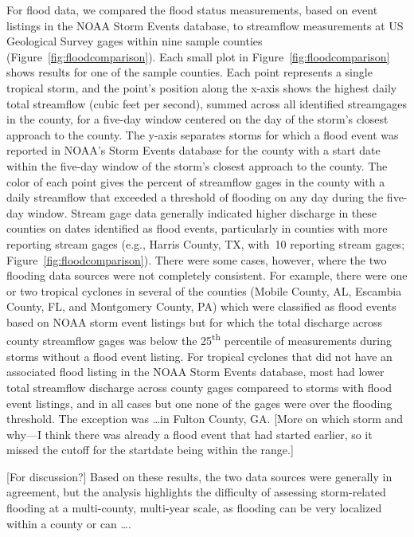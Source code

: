 For flood data, we compared the flood status measurements, based on event
listings in the NOAA Storm Events database, to streamflow measurements at
\ac{US} Geological Survey gages within nine sample counties
(Figure~\ref{fig:floodcomparison}). Each small plot in
Figure~\ref{fig:floodcomparison} shows results for one of the sample counties.
Each point represents a single tropical storm, and the point's position along
the x-axis shows the highest daily total streamflow (cubic feet per second),
summed across all identified streamgages in the county, for a five-day window
centered on the day of the storm's closest approach to the county. The y-axis
separates storms for which a flood event was reported in NOAA's Storm Events
database for the county with a start date within the five-day window of the
storm's closest approach to the county. The color of each point gives the
percent of streamflow gages in the county with a daily streamflow that exceeded
a threshold of flooding on any day during the five-day window.  Stream gage
data generally indicated higher discharge in these counties on dates identified
as flood events, particularly in counties with more reporting stream gages
(e.g., Harris County, TX, with~10 reporting stream gages;
Figure~\ref{fig:floodcomparison}). There were some cases, however, where the
two flooding data sources were not completely consistent. 
For example, there
were one or two tropical cyclones in several of the counties (Mobile County,
AL, Escambia County, FL, and Montgomery County, PA) which were classified as
flood events based on NOAA storm event listings but for which the total
discharge across county streamflow gages was below the 25\textsuperscript{th}
percentile of measurements during storms without a flood event listing. 
For tropical cyclones that did not have an associated flood listing in 
the NOAA Storm Events database, most had lower total streamflow discharge
across county gages compareed to storms with flood event listings, and in all
cases but one none of the gages were over the flooding threshold. The exception
was \ldots in Fulton County, GA. [More on which storm and why---I think there
was already a flood event that had started earlier, so it missed the cutoff for
the startdate being within the range.]

[For discussion?] Based on these results, the two data sources were generally
in agreement, but the analysis highlights the difficulty of assessing
storm-related flooding at a multi-county, multi-year scale, as flooding can be
very localized within a county or can \ldots .   

